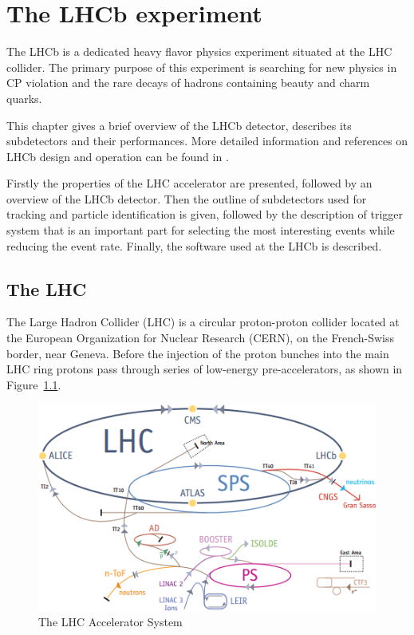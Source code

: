 \chapter{The LHCb experiment}
\label{ch_lhcb}

The LHCb is a dedicated heavy flavor physics experiment situated at the LHC
collider.
The primary purpose of this experiment is searching for new physics in CP
violation and the rare decays of hadrons containing beauty and charm quarks.

This chapter gives a brief overview of the LHCb detector, describes its
subdetectors and their performances. More detailed information and references
on LHCb design and operation can be found in \cite{Alves:2008zz}.

Firstly the properties of the LHC accelerator are presented, followed by an
overview of the LHCb detector. Then the outline of subdetectors used for
tracking and particle identification is given, followed by the description of
trigger system that is an important part for selecting the most interesting
events while reducing the event rate. Finally, the software used at the LHCb
is described.

\section{The LHC}
\label{ch_lhcb:lhc}

The Large Hadron Collider (LHC) is a circular proton-proton collider  located
at the European Organization for Nuclear Research (CERN), on the French-Swiss
border, near Geneva. Before the injection of the proton bunches into the main
LHC ring protons pass through series of low-energy pre-accelerators, as shown
in Figure~\ref{fig:lhc}.

\begin{figure}[H]
\label{fig:lhc}
\centering
\includegraphics[width=\textwidth]{figs/lhc.png}
\caption{\small The LHC Accelerator System}
\end{figure}


